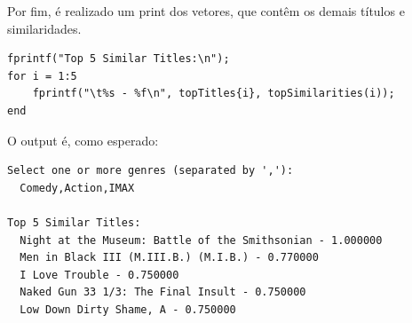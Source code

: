\documentclass[portuguese, 11pt, a4paper,titlepage, oneside]{article}
\begin{document}
Por fim, é realizado um print dos vetores, que contêm os demais títulos e similaridades.
\begin{lstlisting}[style=Matlab-editor]
fprintf("Top 5 Similar Titles:\n");
for i = 1:5
    fprintf("\t%s - %f\n", topTitles{i}, topSimilarities(i));
end
\end{lstlisting}

O output é, como esperado:
\begin{lstlisting}[style=Matlab-editor]
Select one or more genres (separated by ','): 
  Comedy,Action,IMAX

Top 5 Similar Titles:
  Night at the Museum: Battle of the Smithsonian - 1.000000
  Men in Black III (M.III.B.) (M.I.B.) - 0.770000
  I Love Trouble - 0.750000
  Naked Gun 33 1/3: The Final Insult - 0.750000
  Low Down Dirty Shame, A - 0.750000
\end{lstlisting}
\end{document}
